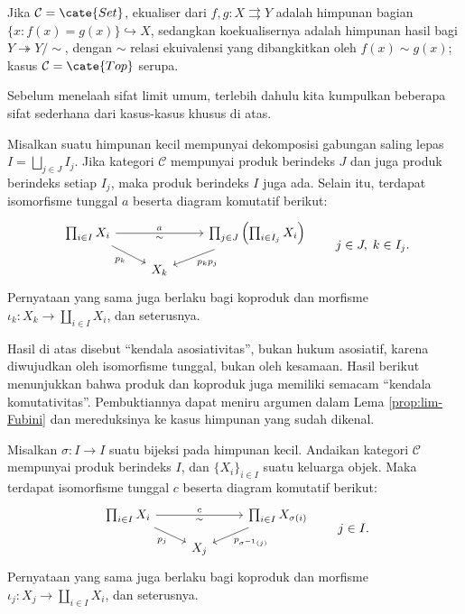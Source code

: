 \begin{asparaenum}
		Jika $\mathcal{C} = \cate{Set}$, ekualiser dari $f, g: X \rightrightarrows Y$ adalah himpunan bagian $\{x: f(x)=g(x)\} \hookrightarrow X$, sedangkan koekualisernya adalah himpunan hasil bagi $Y \twoheadrightarrow Y/\sim$, dengan $\sim$ relasi ekuivalensi yang dibangkitkan oleh $f(x) \sim g(x)$; kasus $\mathcal{C} = \cate{Top}$ serupa.
\end{asparaenum}
Sebelum menelaah sifat limit umum, terlebih dahulu kita kumpulkan beberapa sifat sederhana dari kasus-kasus khusus di atas.

\begin{lemma}\label{prop:product-associativity}
	Misalkan suatu himpunan kecil mempunyai dekomposisi gabungan saling lepas $I = \bigsqcup_{j \in J}  I_j$. Jika kategori $\mathcal{C}$ mempunyai produk berindeks $J$ dan juga produk berindeks setiap $I_j$, maka produk berindeks $I$ juga ada. Selain itu, terdapat isomorfisme tunggal $a$ beserta diagram komutatif berikut:
	\[\begin{tikzcd}[row sep=small]
		 \prod_{i \in I} X_i \arrow[rr, "a", "\sim"'] \arrow[rd, "p_k"'] & & \prod_{j \in J} \left( \prod_{i \in I_j} X_i \right) \arrow[ld, "p_k p_j"] \\
		 & X_k & 
	\end{tikzcd} \qquad j \in J, \; k \in I_j. \]
	Pernyataan yang sama juga berlaku bagi koproduk dan morfisme $\iota_k: X_k \to \coprod_{i \in I} X_i$, dan seterusnya.
\end{lemma}
Hasil di atas disebut ``kendala asosiativitas'', bukan hukum asosiatif, karena diwujudkan oleh isomorfisme tunggal, bukan oleh kesamaan. Hasil berikut menunjukkan bahwa produk dan koproduk juga memiliki semacam ``kendala komutativitas''. Pembuktiannya dapat meniru argumen dalam Lema \ref{prop:lim-Fubini} dan mereduksinya ke kasus himpunan yang sudah dikenal.
\begin{lemma}\label{prop:product-commutativity}
	Misalkan $\sigma: I \to I$ suatu bijeksi pada himpunan kecil. Andaikan kategori $\mathcal{C}$ mempunyai produk berindeks $I$, dan $\{X_i\}_{i \in I}$ suatu keluarga objek. Maka terdapat isomorfisme tunggal $c$ beserta diagram komutatif berikut:
	\[\begin{tikzcd}[row sep=small]
		\prod_{i \in I} X_i \arrow[rr, "c", "\sim"'] \arrow[rd, "p_j"'] & & \prod_{i \in I} X_{\sigma(i)} \arrow[ld, "p_{\sigma^{-1}(j)}"] \\
		& X_j &
	\end{tikzcd} \qquad j \in I. \]
	Pernyataan yang sama juga berlaku bagi koproduk dan morfisme $\iota_j: X_j \to \coprod_{i \in I} X_i$, dan seterusnya.
\end{lemma}


